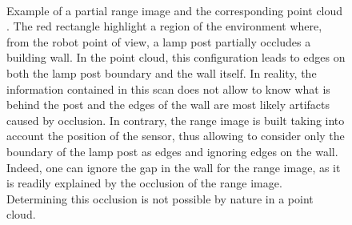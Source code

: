 \begin{figure}[H]
    \centering
    \\
    \caption[Example of a partial range image and the corresponding point cloud with an example of edge caused by an object border.]{Example of a partial range image \protect{} and the corresponding point cloud \protect{}. The red rectangle highlight a region of the environment where, from the robot point of view, a lamp post partially occludes a building wall. In the point cloud, this configuration leads to edges on both the lamp post boundary and the wall itself. In reality, the information contained in this scan does not allow to know what is behind the post and the edges of the wall are most likely artifacts caused by occlusion. In contrary, the range image is built taking into account the position of the sensor, thus allowing to consider only the boundary of the lamp post as edges and ignoring edges on the wall. Indeed, one can ignore the gap in the wall for the range image, as it is readily explained by the occlusion of the range image. Determining this occlusion is not possible by nature in a point cloud.}
    \label{fig:chap_slam_edges}
\end{figure}

